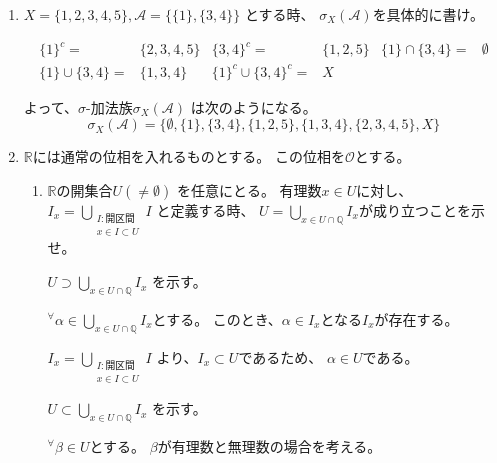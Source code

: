 \documentclass[12pt,b5paper]{ltjsarticle}
\begin{document}
\begin{enumerate}
 \item
      $X=\{ 1,2,3,4,5\},\mathcal{A}=\{ \{1\}, \{3,4\}\}$
      とする時、
      $\sigma_{X}(\mathcal{A})$を具体的に書け。

      \dotfill

      \begin{align}
       \{1\}^{c} =& \{2,3,4,5\} &
       \{3,4\}^{c} =& \{1,2,5\} &
       \{1\} \cap \{3,4\} =& \emptyset\\
       \{1\} \cup \{3,4\} =& \{1,3,4\} &
       \{1\}^{c} \cup \{3,4\}^{c} =& X
      \end{align}

      よって、$\sigma$-加法族$\sigma_{X}(\mathcal{A})$
      は次のようになる。
      \begin{equation}
       \sigma_{X}(\mathcal{A})
        =\{
        \emptyset,
          \{1\}, \{3,4\},
          \{1,2,5\}, \{1,3,4\},
          \{2,3,4,5\}, X
        \}
      \end{equation}

      \hrulefill
 \item
      $\mathbb{R}$には通常の位相を入れるものとする。
      この位相を$\mathcal{O}$とする。
      \begin{enumerate}
       \item
            $\mathbb{R}$の開集合$U(\ne \emptyset)$
            を任意にとる。
            有理数$x\in U$に対し、
            $I_{x}=\bigcup_{\substack{I:\text{開区間}\\x\in I \subset U}}I$
            と定義する時、
            $U=\bigcup_{x\in U\cap \mathbb{Q}}I_{x}$が成り立つことを示せ。

            \dotfill

            $U \supset \bigcup_{x\in U\cap \mathbb{Q}}I_{x}$
            を示す。

            ${}^{\forall}\alpha\in\bigcup_{x\in U\cap \mathbb{Q}}I_{x}$とする。
            このとき、$\alpha\in I_{x}$となる$I_{x}$が存在する。

            $I_{x}=\bigcup_{\substack{I:\text{開区間}\\x\in I \subset U}}I$
            より、$I_{x} \subset U$であるため、
            $\alpha\in U$である。



            $U \subset \bigcup_{x\in U\cap \mathbb{Q}}I_{x}$
            を示す。

            ${}^{\forall}\beta\in U$とする。
            $\beta$が有理数と無理数の場合を考える。
            

\end{enumerate}
\end{enumerate}
\end{document}

